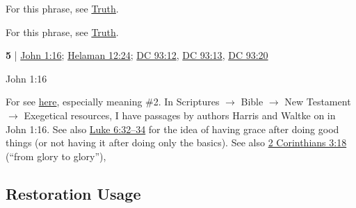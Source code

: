 	\begin{compactdesc}
	
		\item[full of grace and truth] For this phrase, see \hyperref[TRUTH-PHRASES]{Truth}.
		
		\item[grace and truth] For this phrase, see \hyperref[TRUTH-PHRASES]{Truth}.
	
		\item[grace for grace] \textbf{5} | \hyperref[JOHN-1-16]{John 1:16}; \hyperref[HELAMAN-12-24]{Helaman 12:24}; \hyperref[DC93-12]{DC 93:12}, \hyperref[DC93-13]{DC 93:13}, \hyperref[DC93-20]{DC 93:20}
			\begin{compactdesc}
				\item[Bible anchor verses] John 1:16
					\begin{compactdesc}
						\item[John 1:16] 
					\end{compactdesc}
				\item[Commentary] For  see \hyperref[ANTI]{here}, especially meaning \#2. In Scriptures $\rightarrow$ Bible $\rightarrow$ New Testament $\rightarrow$ Exegetical resources, I have passages by authors Harris and Waltke on  in John 1:16. See also \hyperref[LUKE-6-32]{Luke 6:32--34} for the idea of having grace after doing good things (or not having it after doing only the basics). See also \hyperref[2CORINTHIANS-3-18]{2 Corinthians 3:18} (``from glory to glory''),
			\end{compactdesc}
			
	\end{compactdesc}
	

\subsection{Restoration Usage} %
	\label{GRACE-RESTORATION}

	
